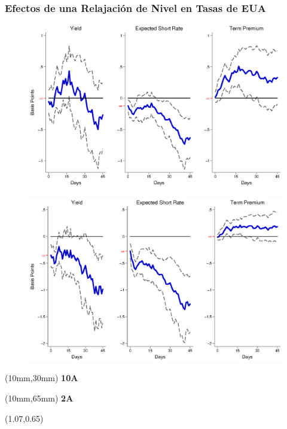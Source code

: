\documentclass[12pt, aspectratio=169, xcolor=dvipsnames]{beamer}
\begin{document}
\begin{frame}[label=TargetUS]
\frametitle{Efectos de una Relajación de Nivel en Tasas de EUA}
\begin{figure}[!htbp]
\begin{center} %
\includegraphics[trim={0cm 0cm 0cm 0cm},clip,height=0.45\textheight,width=0.85\linewidth]{../Figures/LPs/LagDep-FX/Target/US/TargetUSDnomyptp120m.eps}
\par\end{center}
\end{figure}
\vspace{-0.5cm}
\begin{figure}[!htbp]
\begin{center} %
\includegraphics[trim={0cm 0cm 0cm 0.76cm},clip,height=0.45\textheight,width=0.85\linewidth]{../Figures/LPs/LagDep-FX/Target/US/TargetUSDnomyptp24m.eps}
\par\end{center}
\end{figure}
\begin{textblock*}{8mm}(10mm,30mm)
\small \textbf{10A}
\end{textblock*}
\begin{textblock*}{8mm}(10mm,65mm)
\small \textbf{2A}
\end{textblock*}
\begin{textblock*}{5cm}(1.07\textwidth,0.65\textheight)
\hyperlink{TargetEM}{}
\end{textblock*}
\end{frame}
\end{document}
